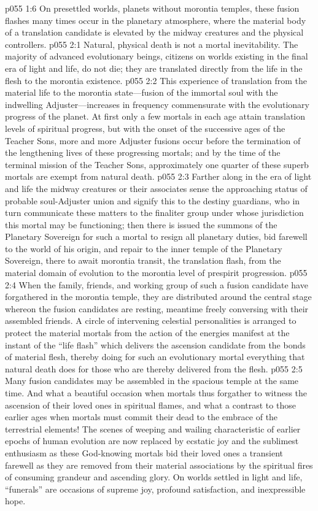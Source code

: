 \pc \vs p055 1:6 On presettled worlds, planets without morontia temples, these fusion flashes many times occur in the planetary atmosphere, where the material body of a translation candidate is elevated by the midway creatures and the physical controllers.
\vs p055 2:1 Natural, physical death is not a mortal inevitability. The majority of advanced evolutionary beings, citizens on worlds existing in the final era of light and life, do not die; they are translated directly from the life in the flesh to the morontia existence.
\vs p055 2:2 This experience of translation from the material life to the morontia state---fusion of the immortal soul with the indwelling Adjuster---increases in frequency commensurate with the evolutionary progress of the planet. At first only a few mortals in each age attain translation levels of spiritual progress, but with the onset of the successive ages of the Teacher Sons, more and more Adjuster fusions occur before the termination of the lengthening lives of these progressing mortals; and by the time of the terminal mission of the Teacher Sons, approximately one quarter of these superb mortals are exempt from natural death.\plusone
\pc \vs p055 2:3 Farther along in the era of light and life the midway creatures or their associates sense the approaching status of probable soul\hyp{}Adjuster union and signify this to the destiny guardians, who in turn communicate these matters to the finaliter group under whose jurisdiction this mortal may be functioning; then there is issued the summons of the Planetary Sovereign for such a mortal to resign all planetary duties, bid farewell to the world of his origin, and repair to the inner temple of the Planetary Sovereign, there to await morontia transit, the translation flash, from the material domain of evolution to the morontia level of prespirit progression.
\pc \vs p055 2:4 When the family, friends, and working group of such a fusion candidate have forgathered in the morontia temple, they are distributed around the central stage whereon the fusion candidates are resting, meantime freely conversing with their assembled friends. A circle of intervening celestial personalities is arranged to protect the material mortals from the action of the energies manifest at the instant of the “life flash” which delivers the ascension candidate from the bonds of material flesh, thereby doing for such an evolutionary mortal everything that natural death does for those who are thereby delivered from the flesh.
\vs p055 2:5 Many fusion candidates may be assembled in the spacious temple at the same time. And what a beautiful occasion when mortals thus forgather to witness the ascension of their loved ones in spiritual flames, and what a contrast to those earlier ages when mortals must commit their dead to the embrace of the terrestrial elements! The scenes of weeping and wailing characteristic of earlier epochs of human evolution are now replaced by ecstatic joy and the sublimest enthusiasm as these God\hyp{}knowing mortals bid their loved ones a transient farewell as they are removed from their material associations by the spiritual fires of consuming grandeur and ascending glory. On worlds settled in light and life, “funerals” are occasions of supreme joy, profound satisfaction, and inexpressible hope.
